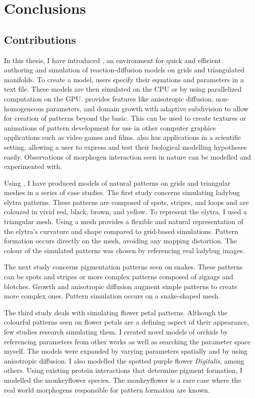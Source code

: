 \chapter{Conclusions}
\section{Contributions}
In this thesis, I have introduced \ProgramName{}, an environment for quick and efficient authoring and simulation of reaction-diffusion models on grids and triangulated manifolds. To create a model, users specify their equations and parameters in a text file. These models are then simulated on the CPU or by using parallelized computation on the GPU. \ProgramName{} provides features like anisotropic diffusion, non-homogeneous parameters, and domain growth with adaptive subdivision to allow for creation of patterns beyond the basic. This can be used to create textures or animations of pattern development for use in other computer graphics applications such as video games and films. \ProgramName{} also has applications in a scientific setting, allowing a user to express and test their biological modelling hypotheses easily. Observations of morphogen interaction seen in nature can be modelled and experimented with.

Using \ProgramName{}, I have produced models of natural patterns on grids and triangular meshes in a series of case studies. The first study concerns simulating ladybug elytra patterns. These patterns are composed of spots, stripes, and loops and are coloured in vivid red, black, brown, and yellow. To represent the elytra, I used a triangular mesh. Using a mesh provides a flexible and natural representation of the elytra's curvature and shape compared to grid-based simulations. Pattern formation occurs directly on the mesh, avoiding any mapping distortion. The colour of the simulated patterns was chosen by referencing real ladybug images.

The next study concerns pigmentation patterns seen on snakes. These patterns can be spots and stripes or more complex patterns composed of zigzags and blotches. Growth and anisotropic diffusion augment simple patterns to create more complex ones. Pattern simulation occurs on a snake-shaped mesh.

The third study deals with simulating flower petal patterns. Although the colourful patterns seen on flower petals are a defining aspect of their appearance, few studies research simulating them. I created novel models of orchids by referencing parameters from other works as well as searching the parameter space myself. The models were expanded by varying parameters spatially and by using anisotropic diffusion. I also modelled the spotted purple flower \textit{Digitalis}, among others. Using existing protein interactions that determine pigment formation, I modelled the monkeyflower species. The monkeyflower is a rare case where the real world morphogens responsible for pattern formation are known.

